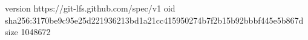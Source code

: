 version https://git-lfs.github.com/spec/v1
oid sha256:3170be9c95e25d221936213bd1a21cc415950274b7f2b15b92bbbf445e5b867d
size 1048672
